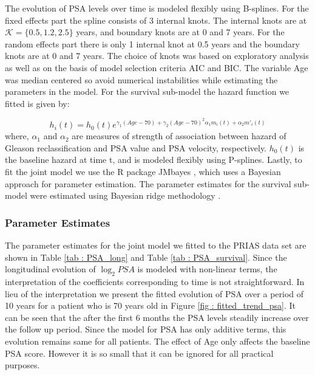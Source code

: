 The evolution of PSA levels over time is modeled flexibly using B-splines. For the fixed effects part the spline consists of 3 internal knots. The internal knots are at $\mathcal{K} =\{0.5, 1.2, 2.5\}$ years, and boundary knots are at 0 and 7 years. For the random effects part there is only 1 internal knot at 0.5 years and the boundary knots are at 0 and 7 years. The choice of knots was based on exploratory analysis as well as on the basis of model selection criteria AIC and BIC. The variable Age was median centered so avoid numerical instabilities while estimating the parameters in the model. For the survival sub-model the hazard function we fitted is given by:

\begin{equation*}
h_i(t) = h_0(t) e^{\gamma_1 (Age-70)  + \gamma_2 (Age-70)^2  \alpha_1 m_i(t) + \alpha_2 m'_i(t)}
\end{equation*}
where, $\alpha_1$ and $\alpha_2$ are measures of strength of association between hazard of Gleason reclassification and PSA value and PSA velocity, respectively. $h_0(t)$ is the baseline hazard at time t, and is modeled flexibly using P-splines\citep{eilers1996flexible}. Lastly, to fit the joint model we use the R package JMbayes \cite{rizopoulosJMbayes}, which uses a Bayesian approach for parameter estimation. The parameter estimates for the survival sub-model were estimated using Bayesian ridge methodology \citep{andrinopoulou2016bayesian}.

\subsubsection{Parameter Estimates}
The parameter estimates for the joint model we fitted to the PRIAS data set are shown in Table \ref{tab : PSA_long} and Table \ref{tab : PSA_survival}. Since the longitudinal evolution of $\log_2 PSA$ is modeled with non-linear terms, the interpretation of the coefficients corresponding to time is not straightforward. In lieu of the interpretation we present the fitted evolution of PSA over a period of 10 years for a patient who is 70 years old in Figure \ref{fig : fitted_trend_psa}. It can be seen that the after the first 6 months the PSA levels steadily increase over the follow up period. Since the model for PSA has only additive terms, this evolution remains same for all patients. The effect of Age only affects the baseline PSA score. However it is so small that it can be ignored for all practical purposes.\\

